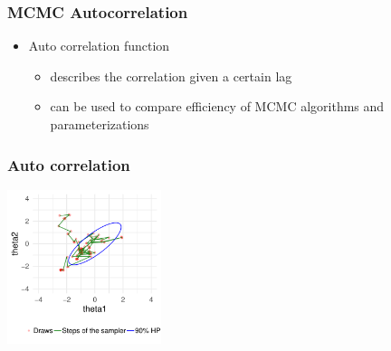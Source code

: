 \documentclass[10pt]{beamer}
\begin{document}
\begin{frame}

\frametitle{MCMC Autocorrelation}

  \begin{itemize}
  \item Auto correlation function
    \begin{itemize}
    \item describes the correlation given a certain lag
    \item can be used to compare efficiency of MCMC algorithms and parameterizations
    \end{itemize}
  \end{itemize}
\end{frame}

\begin{frame}

\frametitle{ Auto correlation}

  \vspace{-0.5\baselineskip}
  \includegraphics[width=4.5cm]{figs/Metrop1.pdf}

\end{frame}
\end{document}
